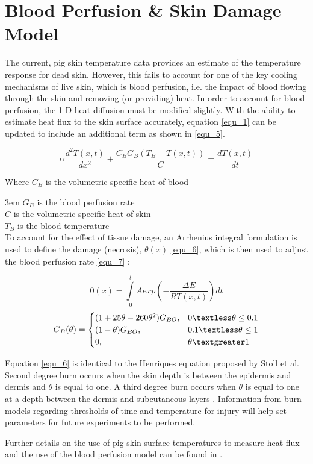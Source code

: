 \clearpage		\large
\chapter{Blood Perfusion \& Skin Damage Model} \label{App:blood_perfusion}

The current, pig skin temperature data provides an estimate of the temperature response for dead skin. However, this fails to account for one of the key cooling mechanisms of live skin, which is blood perfusion, i.e. the impact of blood flowing through the skin and removing (or providing) heat. In order to account for blood perfusion, the 1-D heat diffusion must be modified slightly. With the ability to estimate heat flux to the skin surface accurately, equation \ref{equ_1} can be updated to include an additional term as shown in \ref{equ_5}.

\begin{equation} \label{equ_5} \alpha \frac{d^2T(x,t)}{dx^2} + \frac{C_BG_B(T_B-T(x,t))}{C} = \frac{dT(x,t)}{dt} \end{equation}

Where $C_B$ is the volumetric specific heat of blood

\noindent\hangindent3em
$G_B$ is the blood perfusion rate\\
$C$ is the volumetric specific heat of skin\\
$T_B$ is the blood temperature\\

To account for the effect of tissue damage, an Arrhenius integral formulation is used to define the damage (necrosis), $\theta(x)$ \ref{equ_6}, which is then used to adjust the blood perfusion rate \ref{equ_7} \cite{Torvi_Dale, Abraham_Sparrow}:

\begin{equation} \label{equ_6} 0(x) = \int\limits_0^t A exp(-\frac{\Delta E}{RT(x,t)}) dt \end{equation}
\begin{equation} \label{equ_7} G_B(\theta) = 
\begin{cases}
(1+25\theta-260\theta^2)G_{BO}, 	& 0 \textless \theta \leq 0.1 \\
(1-\theta)G_{BO},					& 0.1 \textless \theta \leq 1 \\
0, 									& \theta \textgreater 1\\
\end{cases}
\end{equation}

Equation \ref{equ_6} is identical to the Henriques equation proposed by Stoll et al. Second degree burn occurs when the skin depth is between the epidermis and dermis and $\theta$ is equal to one. A third degree burn occurs when $\theta$ is equal to one at a depth between the dermis and subcutaneous layers \cite{Time_Temperature_Cutaneous_Burns}. Information from burn models regarding thresholds of time and temperature for injury will help set parameters for future experiments to be performed.

Further details on the use of pig skin surface temperatures to measure heat flux and the use of the blood perfusion model can be found in \cite{Residential_Tenability}.


